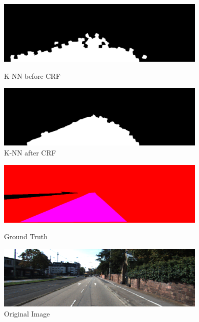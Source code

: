 \documentclass{article} %
\begin{document}
\begin{figure}[htbp]
\centering
\begin{minipage}{2.65in}
\centering
\includegraphics[width=0.9\textwidth]{6.png}
\caption{K-NN before CRF}
\end{minipage}
\begin{minipage}{2.65in}
\centering
\includegraphics[width=0.9\textwidth]{7.png}
\caption{K-NN after CRF}
\end{minipage}
\end{figure}
\begin{figure}[htbp]
\centering
\begin{minipage}{2.65in}
\centering
\includegraphics[width=0.9\textwidth]{8.png}
\caption{Ground Truth}
\end{minipage}
\begin{minipage}{2.65in}
\centering
\includegraphics[width=0.9\textwidth]{9.png}
\caption{Original Image}
\end{minipage}
\end{figure}
\end{document}
